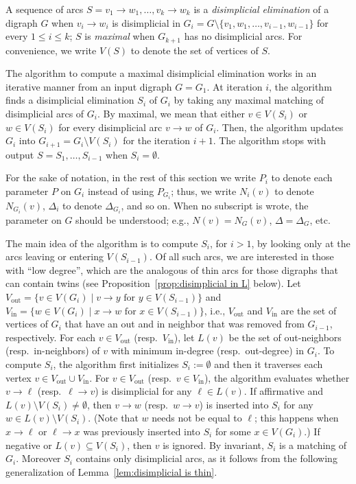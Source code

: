 \documentclass[a4paper,11pt]{article}
\newcommand{\IN}{\ensuremath{\mathrm{in}}}
\newcommand{\OUT}{\ensuremath{\mathrm{out}}}
\begin{document}
A sequence of arcs $S = v_1 \to w_1, \ldots, v_k \to w_k$ is a \emph{disimplicial elimination} of a digraph $G$ when $v_i \to w_i$ is disimplicial in $G_i = G \setminus \{v_1, w_1, \ldots, v_{i-1}, w_{i-1}\}$ for every $1 \leq i \leq k$; $S$ is \emph{maximal} when $G_{k+1}$ has no disimplicial arcs.  For convenience, we write $V(S)$ to denote the set of vertices of $S$.  

The algorithm to compute a maximal disimplicial elimination works in an iterative manner from an input digraph $G = G_1$.  At iteration $i$, the algorithm finds a disimplicial elimination $S_i$ of $G_{i}$ by taking any maximal matching of disimplicial arcs of $G_i$.  By maximal, we mean that either $v \in V(S_i)$ or $w \in V(S_i)$ for every disimplicial arc $v \to w$ of $G_i$.  Then, the algorithm updates $G_{i}$ into $G_{i+1} = G_{i} \setminus V(S_i)$ for the iteration $i+1$.  The algorithm stops with output $S = S_1, \ldots, S_{i-1}$ when $S_i = \emptyset$.  

For the sake of notation, in the rest of this section we write $P_i$ to denote each parameter $P$ on $G_i$ instead of using $P_{G_i}$; thus, we write $N_i(v)$ to denote $N_{G_i}(v)$, $\Delta_i$ to denote $\Delta_{G_i}$, and so on.  When no subscript is wrote, the parameter on $G$ should be understood; e.g., $N(v) = N_G(v)$, $\Delta = \Delta_G$, etc. 

The main idea of the algorithm is to compute $S_i$, for $i > 1$, by looking only at the arcs leaving or entering $V(S_{i-1})$.  Of all such arcs, we are interested in those with ``low degree'', which are the analogous of thin arcs for those digraphs that can contain twins (see Proposition~\ref{prop:disimplicial in L} below).   Let $V_{\OUT} = \{v \in V(G_i) \mid v \to y \text{ for } y \in V(S_{i-1})\}$ and $V_{\IN} = \{w \in V(G_i) \mid x \to w \text{ for } x \in V(S_{i-1})\}$, i.e., $V_{\OUT}$ and $V_{\IN}$ are the set of vertices of $G_i$ that have an out and in neighbor that was removed from $G_{i-1}$, respectively. For each $v \in V_{\OUT}$ (resp.\ $V_{\IN}$), let $L(v)$ be the set of out-neighbors (resp.\ in-neighbors) of $v$ with minimum in-degree (resp.\ out-degree) in $G_i$.  To compute $S_i$, the algorithm first initializes $S_i := \emptyset$ and then it traverses each vertex $v \in V_{\OUT} \cup V_{\IN}$.  For $v \in V_{\OUT}$ (resp.\ $v \in V_{\IN}$), the algorithm evaluates whether $v \to \ell$ (resp.\ $\ell \to v$) is disimplicial for any $\ell \in L(v)$.  If affirmative and $L(v) \setminus V(S_i) \neq\emptyset$, then $v \to w$ (resp.\ $w \to v$) is inserted into $S_i$ for any $w \in L(v) \setminus V(S_i)$.  (Note that $w$ needs not be equal to $\ell$; this happens when $x \to \ell$ or $\ell \to x$ was previously inserted into $S_i$ for some $x \in V(G_i)$.) If negative or $L(v) \subseteq V(S_i)$, then $v$ is ignored.  By invariant, $S_i$ is a matching of $G_i$.  Moreover $S_i$ contains only disimplicial arcs, as it follows from the following generalization of Lemma~\ref{lem:disimplicial is thin}.  
\end{document}
